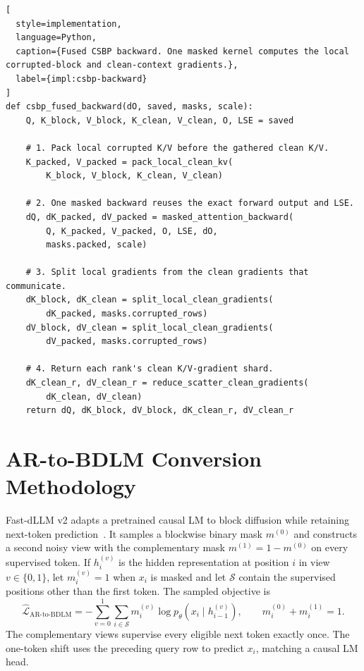 \begin{lstlisting}[
  style=implementation,
  language=Python,
  caption={Fused CSBP backward. One masked kernel computes the local corrupted-block and clean-context gradients.},
  label={impl:csbp-backward}
]
def csbp_fused_backward(dO, saved, masks, scale):
    Q, K_block, V_block, K_clean, V_clean, O, LSE = saved

    # 1. Pack local corrupted K/V before the gathered clean K/V.
    K_packed, V_packed = pack_local_clean_kv(
        K_block, V_block, K_clean, V_clean)

    # 2. One masked backward reuses the exact forward output and LSE.
    dQ, dK_packed, dV_packed = masked_attention_backward(
        Q, K_packed, V_packed, O, LSE, dO,
        masks.packed, scale)

    # 3. Split local gradients from the clean gradients that communicate.
    dK_block, dK_clean = split_local_clean_gradients(
        dK_packed, masks.corrupted_rows)
    dV_block, dV_clean = split_local_clean_gradients(
        dV_packed, masks.corrupted_rows)

    # 4. Return each rank's clean K/V-gradient shard.
    dK_clean_r, dV_clean_r = reduce_scatter_clean_gradients(
        dK_clean, dV_clean)
    return dQ, dK_block, dV_block, dK_clean_r, dV_clean_r
\end{lstlisting}

\section{AR-to-BDLM Conversion Methodology}
\label{app:fast-dllm-v2-objective}

Fast-dLLM v2 adapts a pretrained causal LM to block diffusion while retaining
next-token prediction~\citep{wu2025fastdllmv2}. It samples a blockwise binary
mask $m^{(0)}$ and constructs a second noisy view with the complementary mask
$m^{(1)}=1-m^{(0)}$ on every supervised token. If $h_i^{(v)}$ is the hidden
representation at position $i$ in view $v\in\{0,1\}$, let $m_i^{(v)}=1$ when
$x_i$ is masked and let $\mathcal{S}$ contain the supervised positions other
than the first token. The sampled objective is
\begin{equation}
    \widehat{\mathcal{L}}_{\mathrm{AR\mbox{-}to\mbox{-}BDLM}}
    =
    -\sum_{v=0}^{1}\sum_{i\in\mathcal{S}}
    m_i^{(v)}\log p_\theta\!\left(x_i\mid h_{i-1}^{(v)}\right),
    \qquad
    m_i^{(0)}+m_i^{(1)}=1.
    \label{eq:fast-dllm-v2-objective}
\end{equation}
The complementary views supervise every eligible next token exactly once.
The one-token shift uses the preceding query row to predict $x_i$, matching a
causal LM head.


